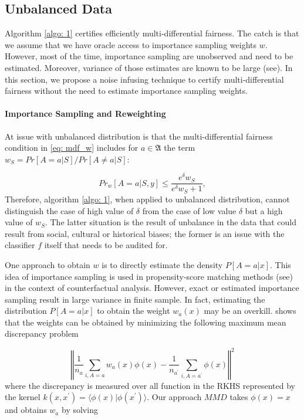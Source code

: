 \documentclass{article}
\begin{document}
\subsection{Unbalanced Data}
Algorithm \ref{algo: 1} certifies efficiently multi-differential fairness. The catch is that we assume that we have oracle access to importance sampling weights $w$. However, most of the time, importance sampling are unobserved and need to be estimated. Moreover, variance of those estimates are known to be large (see). In this section, we propose a noise infusing technique to certify multi-differential fairness without the need to estimate importance sampling weights.

\paragraph{Importance Sampling and Reweighting}
At issue with unbalanced distribution is that the multi-differential fairness condition in \eqref{eq: mdf_w} includes for $a\in\mathfrak{A}$ the term $w_{S}= Pr[A=a|S]/Pr[A\neq a|S]$:

\begin{equation}
    \label{eq: mdf_nw}
    Pr_{w}[A=a |S, y] \leq \frac{e^{\delta}w_{S}}{e^{\delta} w_{S} + 1},
\end{equation}
Therefore, algorithm \ref{algo: 1}, when applied to unbalanced distribution, cannot distinguish the case of high value of $\delta$ from the case of low value $\delta$ but a high value of $w_{S}$. The latter situation is the result of unbalance in the data that could result from social, cultural or historical biases; the former is an issue with the classifier $f$ itself that needs to be audited for. 

\bigskip
One approach to obtain $w$ is to directly estimate the density $P[A=a|x]$. This idea of importance sampling is used in propensity-score matching methods (see) in the context of counterfactual analysis. However, exact or estimated importance sampling result in large variance in finite sample. In fact, estimating the distribution $P[A=a|x]$ to obtain the weight $w_{a}(x)$ may be an overkill. \cite{gretton2009covariate} shows that the weights can be obtained by minimizing the following maximum mean discrepancy problem

\begin{equation}
\label{eq: mmd1}
\left \Vert \frac{1}{n_{a}}\displaystyle\sum_{i, A=a}w_{a}(x)\phi(x) -\frac{1}{n_{a^{'}}}\displaystyle\sum_{i, A=a^{'}}\phi(x)\right \Vert^{2}
\end{equation}
where the discrepancy is measured over all function in the RKHS represented by the kernel $k(x,x^{'})=\langle \phi(x)| \phi(x^{'})\rangle$. Our approach $MMD$ takes $\phi(x)=x$ and obtains $w_{a}$ by solving 
\end{document}
